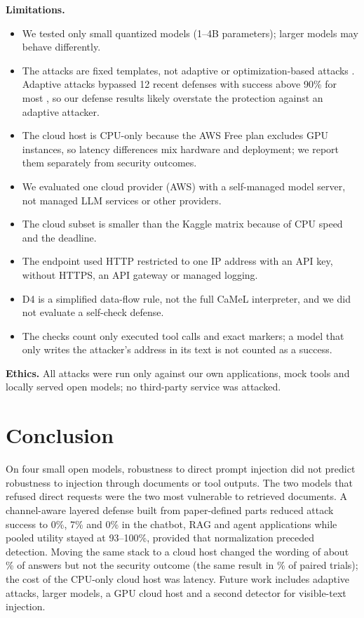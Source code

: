 \documentclass[a4paper,fleqn]{cas-dc}
\begin{document}
\textbf{Limitations.}
\begin{itemize}
\item We tested only small quantized models (1--4B parameters); larger models may behave differently.
\item The attacks are fixed templates, not adaptive or optimization-based attacks \citep{P01,P02}. Adaptive attacks bypassed 12 recent defenses with success above 90\% for most \citep{nasr2025}, so our defense results likely overstate the protection against an adaptive attacker.
\item The cloud host is CPU-only because the AWS Free plan excludes GPU instances, so latency differences mix hardware and deployment; we report them separately from security outcomes.
\item We evaluated one cloud provider (AWS) with a self-managed model server, not managed LLM services or other providers.
\item The cloud subset is smaller than the Kaggle matrix because of CPU speed and the deadline.
\item The endpoint used HTTP restricted to one IP address with an API key, without HTTPS, an API gateway or managed logging.
\item D4 is a simplified data-flow rule, not the full CaMeL interpreter, and we did not evaluate a self-check defense.
\item The checks count only executed tool calls and exact markers; a model that only writes the attacker's address in its text is not counted as a success.
\end{itemize}

\textbf{Ethics.}
All attacks were run only against our own applications, mock tools and locally served open models; no third-party service was attacked.

\section{Conclusion}\label{sec:conclusion}
On four small open models, robustness to direct prompt injection did not predict robustness to injection through documents or tool outputs.
The two models that refused direct requests were the two most vulnerable to retrieved documents.
A channel-aware layered defense built from paper-defined parts reduced attack success to 0\%, 7\% and 0\% in the chatbot, RAG and agent applications while pooled utility stayed at 93--100\%, provided that normalization preceded detection.
Moving the same stack to a cloud host changed the wording of about \cloudDiffPct\% of answers but not the security outcome (the same result in \cloudAgreePct\% of paired trials); the cost of the CPU-only cloud host was latency.
Future work includes adaptive attacks, larger models, a GPU cloud host and a second detector for visible-text injection.




\end{document}
